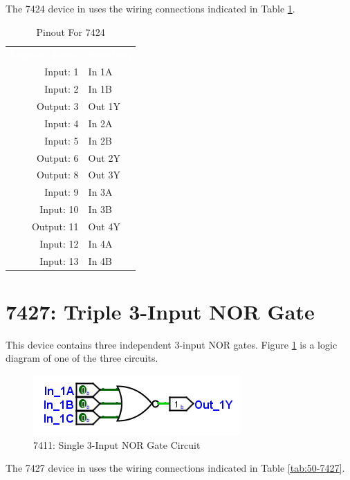 The 7424 device in \LE uses the wiring connections indicated in Table \ref{tab:50-7424}.

\begin{table}[H]
	\sffamily
	\newcommand{\head}[1]{\textcolor{white}{\textbf{#1}}}		
	\begin{center}
		\begin{tabular}{rl} 
			\rowcolor{black!75}
			\head{Logisim Label} & \head{Function} \\
			Input: 1   & In 1A  \\
			Input: 2   & In 1B  \\
			Output: 3  & Out 1Y \\
			Input: 4   & In 2A  \\
			Input: 5   & In 2B  \\
			Output: 6  & Out 2Y \\
			Output: 8  & Out 3Y \\
			Input: 9   & In 3A  \\
			Input: 10  & In 3B  \\
			Output: 11 & Out 4Y \\
			Input: 12  & In 4A  \\
			Input: 13  & In 4B  \\
		\end{tabular}
	\end{center}
	\caption{Pinout For 7424}
	\label{tab:50-7424}
\end{table}

\section{7427: Triple 3-Input NOR Gate}

This device contains three independent 3-input NOR gates. Figure \ref{fig:50-7427} is a logic diagram of one of the three circuits.

\begin{figure}[H]
	\centering
	\includegraphics{gfx/50-7427}
	\caption{7411: Single 3-Input NOR Gate Circuit}
	\label{fig:50-7427}
\end{figure}

The 7427 device in \LE uses the wiring connections indicated in Table \ref{tab:50-7427}.

